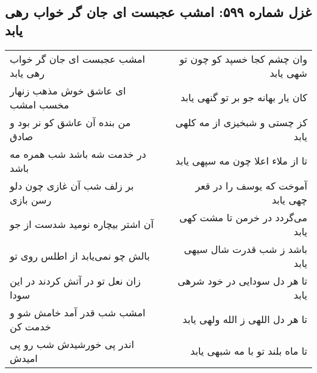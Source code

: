 \begin{center}
\section*{غزل شماره ۵۹۹: امشب عجبست ای جان گر خواب رهی یابد}
\label{sec:0599}
\begin{longtable}{l p{0.5cm} r}
امشب عجبست ای جان گر خواب رهی یابد
&&
وان چشم کجا خسپد کو چون تو شهی یابد
\\
ای عاشق خوش مذهب زنهار مخسب امشب
&&
کان یار بهانه جو بر تو گنهی یابد
\\
من بنده آن عاشق کو نر بود و صادق
&&
کز چستی و شبخیزی از مه کلهی یابد
\\
در خدمت شه باشد شب همره مه باشد
&&
تا از ملاء اعلا چون مه سپهی یابد
\\
بر زلف شب آن غازی چون دلو رسن بازی
&&
آموخت که یوسف را در قعر چهی یابد
\\
آن اشتر بیچاره نومید شدست از جو
&&
می‌گردد در خرمن تا مشت کهی یابد
\\
بالش چو نمی‌یابد از اطلس روی تو
&&
باشد ز شب قدرت شال سیهی یابد
\\
زان نعل تو در آتش کردند در این سودا
&&
تا هر دل سودایی در خود شرهی یابد
\\
امشب شب قدر آمد خامش شو و خدمت کن
&&
تا هر دل اللهی ز الله ولهی یابد
\\
اندر پی خورشیدش شب رو پی امیدش
&&
تا ماه بلند تو با مه شبهی یابد
\\
\end{longtable}
\end{center}
